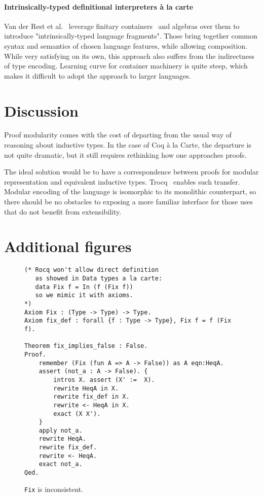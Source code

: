 \documentclass[sigplan,nonacm,review]{acmart}
\begin{document}
\paragraph{Intrinsically-typed definitional interpreters {\`a} la carte}
Van der Rest et al.~\cite{van2022intrinsically} leverage finitary containers~\cite{altenkirch2015indexed} and algebras over them to introduce "intrinsically-typed language fragments".
Those bring together common syntax and semantics of chosen language features, while allowing composition. 
%
%
%
%
While very satisfying on its own, this approach also suffers from the indirectness of type encoding. Learning curve for container machinery is quite steep, which makes it difficult to adopt the approach to larger languages.


\section{Discussion}

Proof modularity comes with the cost of departing from the usual way of reasoning about inductive types. 
In the case of Coq à la Carte, the departure is not quite dramatic, but it still requires rethinking how one approaches proofs.

The ideal solution would be to have a correspondence between proofs for modular representation and equivalent inductive types. Trocq~\cite{cohen2024trocq} enables such transfer. Modular encoding of the language is isomorphic to its monolithic counterpart, so there should be no obstacles to exposing a more familiar interface for those uses that do not benefit from extensibility.





\appendix

\section{Additional figures}
\label{sec:additional-figures}

\begin{figure}[H]
\begin{lstlisting}[language=Coq]
(* Rocq won't allow direct definition
   as showed in Data types a la carte:
   data Fix f = In (f (Fix f))
   so we mimic it with axioms.
*)
Axiom Fix : (Type -> Type) -> Type.
Axiom fix_def : forall {f : Type -> Type}, Fix f = f (Fix f).

Theorem fix_implies_false : False. 
Proof.
    remember (Fix (fun A => A -> False)) as A eqn:HeqA.
    assert (not_a : A -> False). { 
        intros X. assert (X' :=  X).
        rewrite HeqA in X.
        rewrite fix_def in X.
        rewrite <- HeqA in X.
        exact (X X').
    }
    apply not_a.
    rewrite HeqA.
    rewrite fix_def.
    rewrite <- HeqA.
    exact not_a.
Qed.
\end{lstlisting}
\caption{\texttt{Fix} is inconsistent.}
  \label{appendix:false_proof}
\end{figure}
\end{document}
